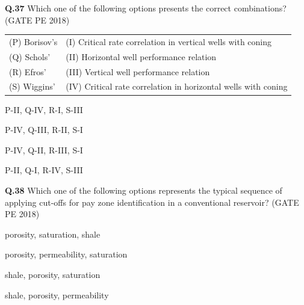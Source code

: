 \documentclass[12pt,a4paper]{article}
\begin{document}
\pagebreak

\noindent\textbf{Q.37} Which one of the following options presents the correct combinations? \hfill (GATE PE 2018)

\vspace{0.3cm}
\begin{tabular}{ll}
(P) Borisov's  & (I) Critical rate correlation in vertical wells with coning \\
(Q) Schols'    & (II) Horizontal well performance relation \\
(R) Efros'     & (III) Vertical well performance relation \\
(S) Wiggins'   & (IV) Critical rate correlation in horizontal wells with coning \\
\end{tabular}

\vspace{0.3cm}
\begin{enumerate}[label=(\Alph*)] 
\begin{multicols}{2}
\item P-II, Q-IV, R-I, S-III \item P-IV, Q-III, R-II, S-I \\
\item P-IV, Q-II, R-III, S-I \item P-II, Q-I, R-IV, S-III \\
\end{multicols}
\end{enumerate}

\vspace{1cm}

\noindent\textbf{Q.38} Which one of the following options represents the typical sequence of applying cut-offs for pay zone identification in a conventional reservoir? \hfill (GATE PE 2018)

\vspace{0.3cm}
\begin{enumerate}[label=(\Alph*)] 
\begin{multicols}{2}
\item porosity, saturation, shale \item porosity, permeability, saturation \\
\item shale, porosity, saturation \item shale, porosity, permeability \\
\end{multicols}
\end{enumerate}
\end{document}
